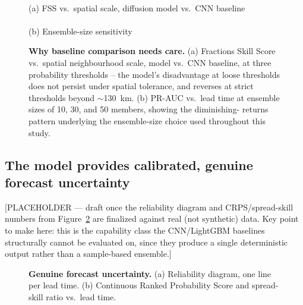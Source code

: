 \documentclass[pdflatex,sn-nature]{sn-jnl}%
\begin{document}
\begin{figure}[t]
\centering
{}\\[4pt]
(a) FSS vs.\ spatial scale, diffusion model vs.\ CNN baseline\\[10pt]
\\[4pt]
(b) Ensemble-size sensitivity
\caption{\textbf{Why baseline comparison needs care.} (a) Fractions
Skill Score vs.\ spatial neighbourhood scale, model vs.\ CNN baseline,
at three probability thresholds -- the model's disadvantage at loose
thresholds does not persist under spatial tolerance, and reverses at
strict thresholds beyond $\sim$130~km. (b) PR-AUC vs.\ lead time at
ensemble sizes of 10, 30, and 50 members, showing the diminishing-
returns pattern underlying the ensemble-size choice used throughout
this study.}
\label{fig:verification}
\end{figure}

\subsection*{The model provides calibrated, genuine forecast uncertainty}

[PLACEHOLDER --- draft once the reliability diagram and CRPS/spread-skill
numbers from Figure~\ref{fig:uncertainty} are finalized against real
(not synthetic) data. Key point to make here: this is the capability
class the CNN/LightGBM baselines structurally cannot be evaluated on,
since they produce a single deterministic output rather than a
sample-based ensemble.]

\begin{figure}[t]
\centering
{}
\caption{\textbf{Genuine forecast uncertainty.} (a) Reliability diagram,
one line per lead time. (b) Continuous Ranked Probability Score and
spread-skill ratio vs.\ lead time.}
\label{fig:uncertainty}
\end{figure}
\end{document}
